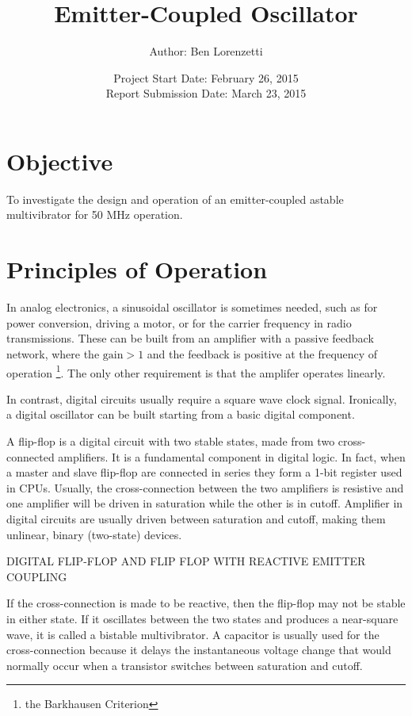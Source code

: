 \documentclass[titlepage, letterpaper, 10.5pt]{article}
\begin{document}
\title{Emitter-Coupled Oscillator}
\author{Author: Ben Lorenzetti}
\date{Project Start Date: February 26, 2015\\
Report Submission Date: March 23, 2015}
\maketitle

\clearpage
\mbox{}
\thispagestyle{empty}
\clearpage
\setcounter{page}{1}

\tableofcontents

\section{Objective}

To investigate the design and operation of an emitter-coupled astable multivibrator for 50
MHz operation.

\clearpage
\section{Principles of Operation}

In analog electronics, a sinusoidal oscillator is sometimes needed,
such as for power conversion, driving a motor, or for the carrier frequency in radio transmissions.
These can be built from an amplifier with a passive feedback network,
where the $\textrm{gain}>1$ and the feedback is positive at the frequency of operation
\footnote{the Barkhausen Criterion}.
The only other requirement is that the amplifer operates linearly.

In contrast, digital circuits usually require a square wave clock signal.
Ironically, a digital oscillator can be built starting from a basic digital component.

A flip-flop is a digital circuit with two stable states, made from two cross-connected amplifiers.
It is a fundamental component in digital logic.
In fact, when a master and slave flip-flop are connected in series they form a 1-bit register used in CPUs.
Usually, the cross-connection between the two amplifiers is resistive and one amplifier
will be driven in saturation while the other is in cutoff.
Amplifier in digital circuits are usually driven between saturation and cutoff,
making them unlinear, binary (two-state) devices.

DIGITAL FLIP-FLOP AND FLIP FLOP WITH REACTIVE EMITTER COUPLING

If the cross-connection is made to be reactive, then the flip-flop may not be stable in either state.
If it oscillates between the two states and produces a near-square wave, it is called a bistable multivibrator.
A capacitor is usually used for the cross-connection because it delays the instantaneous voltage change
that would normally occur when a transistor switches between saturation and cutoff.
\end{document}

